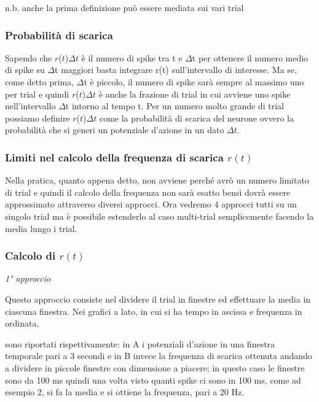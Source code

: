 \documentclass[12pt,a4paper,openany]{book}
\begin{document}
n.b. anche la prima definizione può essere mediata sui vari trial

\subsubsection{Probabilità di scarica}

Sapendo che $r$($t$)$\Delta$$t$ è il numero di spike tra t e $\Delta$t per ottenere il numero medio di spike su $\Delta$t maggiori basta integrare r(t) sull'intervallo di interesse. Ma se, come detto prima, $\Delta$t è piccolo, il numero di spike sarà sempre al massimo uno per trial e quindi $r$($t$)$\Delta$$t$ è anche la frazione di trial in cui avviene uno spike nell'intervallo $\Delta$t intorno al tempo t. Per un numero molto grande di trial possiamo definire $r$($t$)$\Delta$$t$ come la probabilità di scarica del neurone ovvero la probabilità che si generi un potenziale d'azione in un dato $\Delta$$t$.

\subsubsection{Limiti nel calcolo della frequenza di scarica $r(t)$}

Nella pratica, quanto appena detto, non avviene perché avrò un numero limitato di trial e quindi il calcolo della frequenza non sarà esatto bensì dovrà essere approssimato attraverso diversi approcci. Ora vedremo 4 approcci tutti su un singolo trial ma è possibile estenderlo al caso multi-trial semplicemente facendo la media lungo i trial.

\subsubsection{Calcolo di $r(t)$}

\textit{1° approccio}

Questo approccio consiste nel dividere il trial in finestre ed effettuare la media in ciascuna finestra. Nei grafici a lato, in cui si ha tempo in ascissa e frequenza in ordinata,

sono riportati rispettivamente: in A i potenziali d'azione in una finestra temporale pari a 3 secondi e in B invece la frequenza di scarica ottenuta andando a dividere in piccole finestre con dimensione a piacere; in questo caso le finestre sono da 100 ms quindi una volta visto quanti spike ci sono in 100 ms, come ad esempio 2, si fa la media e si ottiene la frequenza, pari a 20 Hz.
\end{document}
